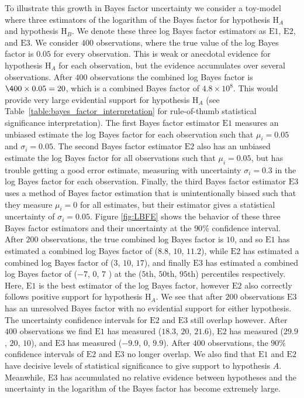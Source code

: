To illustrate this growth in Bayes factor uncertainty we consider a toy-model where three estimators of the logarithm of the Bayes factor for hypothesis $\mathrm{H}_A$ and hypothesis $\mathrm{H}_B$. We denote these three log Bayes factor estimators as $\mathrm{E1}$, $\mathrm{E2}$, and $\mathrm{E3}$. We consider $400$ observations, where the true value of the log Bayes factor is $0.05$ for every observation. This is weak or anecdotal evidence for hypothesis $\mathrm{H}_A$ for each observation, but the evidence accumulates over several observations. After $400$ observations the combined log Bayes factor is $\400 \times 0.05 = 20$, which is a combined Bayes factor of $4.8 \times 10^8$. This would provide very large evidential support for hypothesis $\mathrm{H}_A$ (see Table~\ref{table:bayes_factor_interpretation} for rule-of-thumb statistical significance interpretation). The first Bayes factor estimator $\mathrm{E1}$ measures an unbiased estimate the log Bayes factor for each observation such that $\mu_i = 0.05$ and $\sigma_i = 0.05$. The second Bayes factor estimator $\mathrm{E2}$ also has an unbiased estimate the log Bayes factor for all observations such that $\mu_i = 0.05$, but has trouble getting a good error estimate, measuring with uncertainty $\sigma_i = 0.3$ in the log Bayes factor for each observation. Finally, the third Bayes factor estimator $\mathrm{E3}$ uses a method of Bayes factor estimation that is unintentionally biased such that they measure $\mu_i=0$ for all estimates, but their estimator gives a statistical uncertainty of $\sigma_i = 0.05$. Figure \ref{fig:LBFE} shows the behavior of these three Bayes factor estimators and their uncertainty at the $90 \%$ confidence interval. After $200$ observations, the true combined log Bayes factor is $10$, and so $\mathrm{E1}$ has estimated a combined log Bayes factor of ($8.8$, $10$, $11.2$), while $\mathrm{E2}$ has estimated a combined log Bayes factor of ($3$, $10$, $17$), and finally $\mathrm{E3}$ has estimated a combined log Bayes factor of ($-7$, $0$, $7$ )  at the ($5$th, $50$th, $95$th) percentiles respectively. Here, $\mathrm{E1}$ is the best estimator of the log Bayes factor, however $\mathrm{E2}$ also correctly follows positive support for hypothesis $\mathrm{H}_A$. We see that after $200$ observations $\mathrm{E3}$ has an unresolved Bayes factor with no evidential support for either hypothesis. The uncertainty confidence intervals for $\mathrm{E2}$ and $\mathrm{E3}$ still overlap however. After $400$ observations we find $\mathrm{E1}$ has measured ($18.3$, $20$, $21.6$), $\mathrm{E2}$ has measured ($29.9$, $20$, $10$), and $\mathrm{E3}$ has measured ($-9.9$, $0$, $9.9$). After $400$ observations, the $90 \%$ confidence intervals of $\mathrm{E2}$ and $\mathrm{E3}$ no longer overlap. We also find that $\mathrm{E1}$ and $\mathrm{E2}$ have decisive levels of statistical significance to give support to hypothesis $A$. Meanwhile, $\mathrm{E3}$ has accumulated no relative evidence between hypotheses and the uncertainty in the logarithm of the Bayes factor has become extremely large. 

